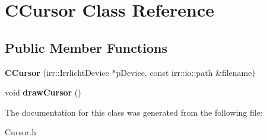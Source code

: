 \hypertarget{class_c_cursor}{
\section{CCursor Class Reference}
\label{class_c_cursor}
}
\subsection*{Public Member Functions}
\begin{DoxyCompactItemize}
\item 
\hypertarget{class_c_cursor_a2acac5ef467e7ba4363aec0f82ae127b}{
{\bfseries CCursor} (irr::IrrlichtDevice $\ast$pDevice, const irr::io::path \&filename)}
\label{class_c_cursor_a2acac5ef467e7ba4363aec0f82ae127b}

\item 
\hypertarget{class_c_cursor_a4392250dff471f7c87f9c2d34d5e302a}{
void {\bfseries drawCursor} ()}
\label{class_c_cursor_a4392250dff471f7c87f9c2d34d5e302a}

\end{DoxyCompactItemize}


The documentation for this class was generated from the following file:\begin{DoxyCompactItemize}
\item 
Cursor.h\end{DoxyCompactItemize}

